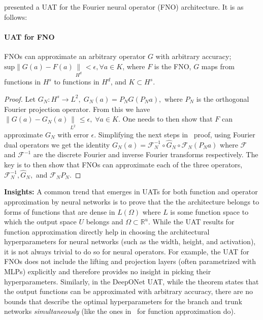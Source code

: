 \documentclass[12pt]{exam}
\def\R{\mathbb{R}}
\def\F{\mathcal{F}}
\begin{document}
\begin{questions}
\citep{kovachki2021universal} presented a UAT for the Fourier neural operator (FNO) architecture. It is as follows:
\paragraph{UAT for FNO}
\begin{theorem}
FNOs can approximate an arbitrary operator $G$ with arbitrary accuracy; $\text{sup} \|G(a) - F(a)\|\limits_{H^d} < \epsilon, \forall a \in K$, where $F$ is the FNO, $G$ maps from functions in $H^s$ to functions in $H^d$, and $K \subset H^s$.
\begin{proof}
Let $G_N: H^s \rightarrow L^2, \; G_N(a) = P_N G(P_N a),$ where $P_N$ is the orthogonal Fourier projection operator. From this we have $\|G(a) - G_N(a)\|\limits_{L^2} \le \epsilon, \; \forall a \in K$. One needs to then show that $F$ can approximate $G_N$ with error $\epsilon$. Simplifying the next steps in~\citep{kovachki2021universal} proof, using Fourier dual operators we get the identity $G_N(a) = \F_N^{-1} \circ \hat{G}_N \circ \F_N (P_N a)$ where $\F$ and $\F^{-1}$ are the discrete Fourier and inverse Fourier transforms respectively. The key is to then show that FNOs can approximate each of the three operators, $\F_N^{-1}, \hat{G}_N,$ and $\F_N P_N$.
\end{proof}
\end{theorem}
{\bf Insights:} A common trend that emerges in UATs for both function and operator approximation by neural networks is to prove that the the architecture belongs to forms of functions that are dense in $L(\Omega)$ where $L$ is some function space to which the output space $U$ belongs and $\Omega \subset \R^u$. While the UAT results for function approximation directly help in choosing the architectural hyperparameters for neural networks (such as the width, height, and activation), it is not always trivial to do so for neural operators. For example, the UAT for FNOs does not include the lifting and projection layers (often parametrized with MLPs) explicitly and therefore provides no insight in picking their hyperparameters. Similarly, in the DeepONet UAT, while the theorem states that the output functions can be approximated with arbitrary accuracy, there are no bounds that describe the optimal hyperparameters for the branch and trunk networks \emph{simultaneously} (like the ones in~\citep{lu2017expressive, park2020minimum} for function approximation do).


\end{questions}
\end{document}
